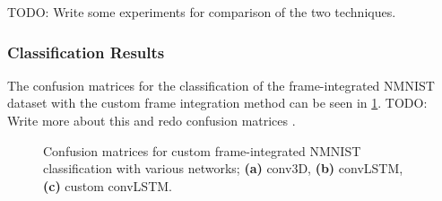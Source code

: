 \color{red} TODO: Write some experiments for comparison of the two techniques. \color{black} 

\subsubsection{Classification Results}

The confusion matrices for the classification of the frame-integrated  NMNIST dataset with the custom frame integration method can be seen in \cref{fig:nmnist_custom_frame_c_matrices}. \color{red} TODO: Write more about this and redo confusion matrices \color{black}.

\begin{figure}[htb]%
    \centering
    \qquad
    \qquad
    \caption{Confusion matrices for custom frame-integrated NMNIST classification with various networks; \textbf{(a)} conv3D, \textbf{(b)} convLSTM, \textbf{(c)} custom convLSTM.}%
    \label{fig:nmnist_custom_frame_c_matrices}%
\end{figure}

